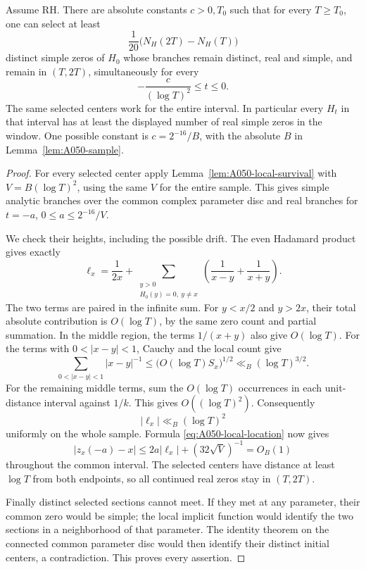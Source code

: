 \begin{theorem}
\label{thm:A050-survival}
Assume RH. There are absolute constants \(c>0,T_0\) such
that for every \(T\ge T_0\), one can select at least
\[
                         \frac1{20}\bigl(N_H(2T)-N_H(T)\bigr)
\]
distinct simple zeros of \(H_0\) whose branches remain
distinct, real and simple, and remain in \((T,2T)\),
simultaneously for every
\[
                         -\frac c{(\log T)^2}\le t\le0.
\]
The same selected centers work for the entire interval.
In particular every \(H_t\) in that interval has at least
the displayed number of real simple zeros in the window.
One possible constant is \(c=2^{-16}/B\), with the
absolute \(B\) in Lemma~\ref{lem:A050-sample}.
\end{theorem}

\begin{proof}
For every selected center apply
Lemma~\ref{lem:A050-local-survival} with
\(V=B(\log T)^2\), using the same \(V\) for the entire
sample. This gives simple analytic branches over the
common complex parameter disc and real branches for
\(t=-a\), \(0\le a\le2^{-16}/V\).

We check their heights, including the possible drift.
The even Hadamard product gives exactly
\[
 \ell_x=\frac1{2x}+
 \sum_{\substack{y>0\\H_0(y)=0,\ y\ne x}}
                  \left(\frac1{x-y}+\frac1{x+y}\right).
\]
The two terms are paired in the infinite sum. For
\(y<x/2\) and \(y>2x\), their total absolute contribution
is \(O(\log T)\), by the same zero count and partial
summation. In the middle region, the terms \(1/(x+y)\)
also give \(O(\log T)\). For the terms with
\(0<|x-y|<1\), Cauchy and the local count give
\[
 \sum_{0<|x-y|<1}|x-y|^{-1}
        \le\bigl(O(\log T)S_x\bigr)^{1/2}
                         \ll_B(\log T)^{3/2}.
\]
For the remaining middle terms, sum the
\(O(\log T)\) occurrences in each unit-distance interval
against \(1/k\). This gives \(O((\log T)^2)\).
Consequently
\[
                         |\ell_x|\ll_B(\log T)^2
\]
uniformly on the whole sample. Formula
\eqref{eq:A050-local-location} now gives
\[
 |z_x(-a)-x|
       \le2a|\ell_x|+(32\sqrt V)^{-1}=O_B(1)
\]
throughout the common interval. The selected centers
have distance at least \(\log T\) from both endpoints,
so all continued real zeros stay in \((T,2T)\).

Finally distinct selected sections cannot meet. If they
met at any parameter, their common zero would be simple;
the local implicit function would identify the two
sections in a neighborhood of that parameter. The
identity theorem on the connected common parameter disc
would then identify their distinct initial centers, a
contradiction. This proves every assertion.
\end{proof}

